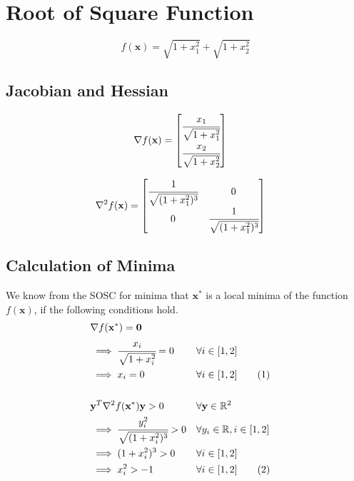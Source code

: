 \documentclass[a4paper]{article}
\newcommand\numberthis{\addtocounter{equation}{1}\tag{\theequation}}
\begin{document}
\section{Root of Square Function}

$$f(\textbf{x}) = \sqrt{1 + x_1^2} + \sqrt{1 + x_2^2}$$

\subsection{Jacobian and Hessian}

\begin{align*}
\nabla f(\textbf{x}) &=
    \begin{bmatrix}
        \cfrac{x_1}{\sqrt{1 + x_1^2}} \\
        \cfrac{x_2}{\sqrt{1 + x_2^2}}
    \end{bmatrix}
\end{align*}

\begin{align*}
\nabla^2 f(\textbf{x}) &=
    \begin{bmatrix}
        \cfrac{1}{\sqrt{(1 + x_1^2)^3}} & 0 \\
        0 & \cfrac{1}{\sqrt{(1 + x_1^2)^3}} \\
    \end{bmatrix}
\end{align*}

\subsection{Calculation of Minima}

We know from the SOSC for minima that $\textbf{x}^*$ is a local minima of the function $f(\textbf{x})$, if the following conditions hold.
\begin{align*}
&\nabla f(\textbf{x}^*) = \textbf{0} \\
&\implies \cfrac{x_i}{\sqrt{1 + x_i^2}} = 0 &&\forall i \in [1, 2] \\
&\implies x_i = 0 &&\forall i \in [1, 2] \numberthis \label{rootsq-sosc-1} \\ \\
&\textbf{y}^T \nabla^2 f(\textbf{x}^*) \textbf{y} > 0 &&\forall \textbf{y} \in \mathbb{R}^2 \\
&\implies \cfrac{y_i^2}{\sqrt{(1 + x_i^2)^3}} > 0 &&\forall y_i \in \mathbb{R}, i \in [1, 2] \\
&\implies (1 + x_i^2)^3 > 0 &&\forall i \in [1, 2] \\
&\implies x_i^2 > -1 &&\forall i \in [1, 2] \numberthis \label{rootsq-sosc-2}
\end{align*}
\end{document}
